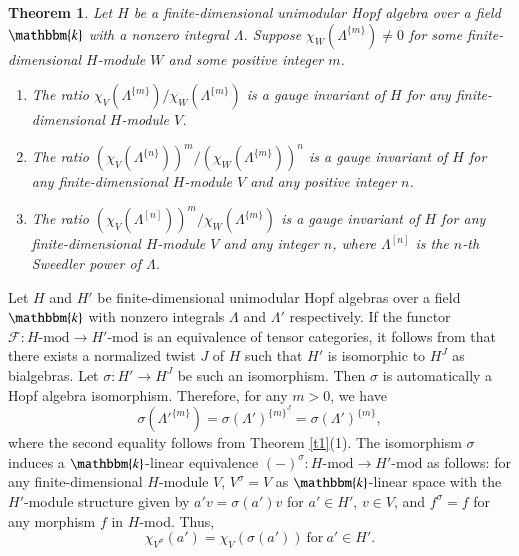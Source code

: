 \documentclass[11pt]{amsart}
\newtheorem{thm}{Theorem}[section]
\numberwithin{equation}{section}
\begin{document}
\begin{thm}\label{prop112}
Let $H$ be a finite-dimensional unimodular Hopf algebra over a field $\mathbbm{k}$ with a nonzero integral $\Lambda$.
Suppose $\chi_{W}(\Lambda^{\{m\}})\neq0$ for some finite-dimensional $H$-module $W$ and some positive integer $m$.
\begin{enumerate}
\item The ratio $\chi_{V}(\Lambda^{\{m\}})/\chi_{W}(\Lambda^{\{m\}})$ is a gauge invariant of $H$ for any finite-dimensional $H$-module $V$.

\item The ratio $(\chi_{V}(\Lambda^{\{n\}}))^m/(\chi_{W}(\Lambda^{\{m\}}))^n$ is a gauge invariant of $H$ for any finite-dimensional $H$-module $V$ and any positive integer $n$.

\item The ratio $(\chi_{V}(\Lambda^{[n]}))^m/\chi_{W}(\Lambda^{\{m\}})$ is a gauge invariant of $H$ for any finite-dimensional $H$-module $V$ and any integer $n$, where $\Lambda^{[n]}$ is the $n$-th Sweedler power of $\Lambda$.
\end{enumerate}\end{thm}
\proof
Let $H$ and $H'$ be finite-dimensional unimodular Hopf algebras over a field $\mathbbm{k}$ with nonzero integrals $\Lambda$ and $\Lambda'$ respectively. If the functor $\mathcal{F}:H\text{-mod}\rightarrow H'\text{-mod}$ is an equivalence of tensor categories, it follows from \cite[Theorem 2.2]{NS1} that there exists
a normalized twist $J$ of $H$  such that $H'$ is isomorphic to $H^J$ as bialgebras. Let $\sigma:H'\rightarrow H^J$ be such an isomorphism. Then $\sigma$ is
automatically a Hopf algebra isomorphism. Therefore, for any $m>0$, we have
$$\sigma(\Lambda'^{\{m\}})=\sigma(\Lambda')^{\{m\}^J}=\sigma(\Lambda')^{\{m\}},$$ where the second equality follows from  Theorem \ref{t1}(1). 
The isomorphism $\sigma$ induces a $\mathbbm{k}$-linear equivalence $(-)^\sigma:H\text{-mod}\rightarrow H'\text{-mod}$ as follows:  for any finite-dimensional $H$-module $V$, $V^{\sigma}=V$ as $\mathbbm{k}$-linear space with the $H'$-module structure given by $a'v=\sigma(a')v$ for $a'\in H'$, $v\in V$, and $f^\sigma=f$ for any morphism $f$ in $H$-mod.
Thus, $$\chi_{V^{\sigma}}(a')=\chi_V(\sigma(a'))\ \text{for}\ a'\in H'.$$
\end{document}
